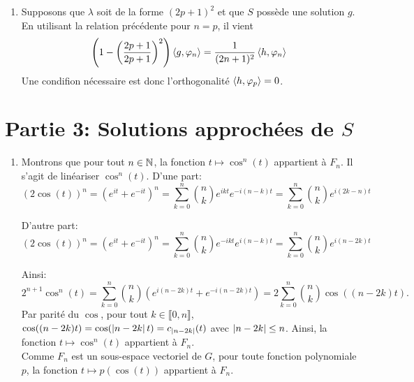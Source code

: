 \begin{enumerate}
\item Supposons que $\lambda$ soit de la forme $(2p+1)^2$ et que $S$ possède une solution $g$. En utilisant la relation précédente pour $n=p$, il vient
\begin{displaymath}
  \left(1-\left( \frac{2p+1}{2p+1}\right)^2  \right)\left\langle {g} , {\varphi_n} \right\rangle = \frac{1}{(2n+1)^2}\left\langle {h} , {\varphi_n} \right\rangle 
\end{displaymath}
Une condifion nécessaire est donc l'orthogonalité $\left\langle {h} , {\varphi_{p}} \right\rangle = 0$. 
\end{enumerate}

\section*{Partie 3: Solutions approchées de $S$}
\begin{enumerate}
\item Montrons que pour tout $n\in \mathbb{N}$, la fonction $t\mapsto \cos^{n}(t)$ appartient à $F_{n}$. Il s'agit de linéariser $\cos^{n}(t)$. D'une part:
\begin{displaymath}
(2\cos(t))^{n}  = \left ( e^{it}+e^{-it}\right )^{n} 
 = \sum_{k=0}^{n}\binom{n}{k}e^{ikt}e^{-i(n-k)t}
 = \sum_{k=0}^{n}\binom{n}{k}e^{i(2k-n)t}
\end{displaymath}

D'autre part:
\begin{displaymath}
(2\cos(t))^{n}  = \left ( e^{it}+e^{-it}\right )^{n} 
 = \sum_{k=0}^{n}\binom{n}{k}e^{-ikt}e^{i(n-k)t}
 = \sum_{k=0}^{n}\binom{n}{k}e^{i(n-2k)t}
\end{displaymath}

Ainsi:
$$2^{n+1}\cos^{n}(t) = \sum_{k=0}^{n}\binom{n}{k}\left ( e^{i(n-2k)t} + e^{-i(n-2k)t}\right ) = 2\sum_{k=0}^{n}\binom{n}{k}\cos((n-2k)t).$$
Par parité du $\cos$, pour tout $k\in  \llbracket 0,n\rrbracket$, $\cos((n-2k)t) = \cos(\left\vert n-2k\right\vert t) = c_{\left\vert n-2k\right\vert}(t)$ avec $\left\vert n-2k\right\vert\leq n$. Ainsi, la fonction $t\mapsto \cos^{n}(t)$ appartient à $F_{n}$. \\
Comme $F_{n}$ est un sous-espace vectoriel de $G$, pour toute fonction polynomiale $p$, la fonction $t\mapsto p(\cos(t))$ appartient à $F_{n}$. 


\end{enumerate}
